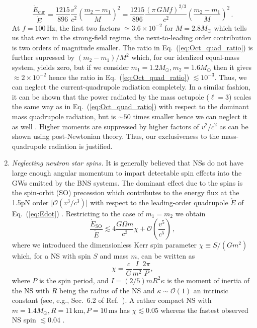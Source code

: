 \documentclass[prd,amsmath,amssymb,aps,floats,amsfonts,notitlepage,superscriptaddress,eqsecnum,nofootinbib,10pt]{revtex4-1}
\newcommand{\ord}{\mathcal{O}}
\newcommand{\f}{\frac}
\newcommand{\be}{\begin{equation}}
\newcommand{\ee}{\end{equation}}
\begin{document}
\begin{enumerate}
%
\be
\f{\dot{E}_\text{cur}}{\dot{E}} = \f{1215}{896} \f{v^2}{c^2}\left(\f{m_2-m_1}{M}\right)^2=\f{1215}{896}\f{(\pi\, G M f)^{2/3}}{c^2}\left(\f{m_2-m_1}{M}\right)^2\, . \label{eq:Oct_quad_ratio}
\ee
%
At $f=100\,$Hz, the first two factors $\simeq 3.6\times 10^{-2}$ for $M=2.8 M_\odot$ which tells us that even in the strong-field regime, 
the next-to-leading order contribution is two orders of magnitude smaller.
The ratio in Eq.~(\ref{eq:Oct_quad_ratio}) is further supressed by $(m_2-m_1)/M^2$ which, for our idealized equal-mass system, 
yields zero, but if we consider $m_1=1.2 M_\odot, m_2=1.6 M_\odot$ then it gives $\approx 2\times 10^{-2}$ hence the ratio in Eq.~(\ref{eq:Oct_quad_ratio}) $\lesssim 10^{-3}$.
Thus, we can neglect the current-quadrupole radiation completely. In a similar fashion, it can be shown that the power radiated by the mass octupole ($\ell=3$)
scales the same way as in Eq.~(\ref{eq:Oct_quad_ratio}) with respect to the dominant mass quadrupole radiation, but is $\sim 50$ times smaller hence we can neglect it as well \cite{Maggiore}.
Higher moments are suppressed by higher factors of $v^2/c^2$ as can be shown using post-Newtonian theory. 
Thus, our exclusiveness to the mass-quadrupole radiation is justified.
% 
%
\item {\it Neglecting neutron star spins.}
It is generally believed that NSs do not have large enough angular momentum to impart detectable spin effects into the GWs emitted by the BNS systems.
The dominant effect due to the spins is the spin-orbit (SO) precession which contributes to the energy flux at the 1.5pN order [$\ord(v^3/c^3)$] with respect to the leading-order quadrupole $\dot{E}$ of Eq.~(\ref{eq:Edot}) \cite{Blanchet_LRR}. 
Restricting to the case of $m_1=m_2$ we obtain
%
\be
\f{\dot{E}_{\text{SO}}}{\dot{E}} \lesssim 4 \f{G\Omega m}{c^3}\chi + \ord\left(\f{v^5}{c^5}\right) \label{eq:spin_orbit}\, ,
\ee
%
where we introduced the dimensionless Kerr spin parameter $\chi\equiv {S}/({G m^2})$ which, for a NS with spin $S$ and mass $m$, can be written as
%
\be
\chi=\f{c}{G} \f{I}{m^2} \f{2\pi}{P},  \label{eq:NS_spin}
\ee
%
where $P$ is the spin period, and $ I = (2/5) m R^2 \kappa$ is the moment of inertia of the NS with $R$ being the radius of the NS and $\kappa \sim \ord(1)$ an intrinsic constant (see, e.g., Sec.~6.2 of Ref.~\cite{Colpi_Sesana}). 
A rather compact NS with $m=1.4 M_\odot, R=11\,\text{km}, P= 10\,\text{ms}$ has $\chi\lesssim 0.05$ whereas
the fastest observed NS spin $\lesssim 0.04$ \cite{FastestNSspin}.

\end{enumerate}
\end{document}
